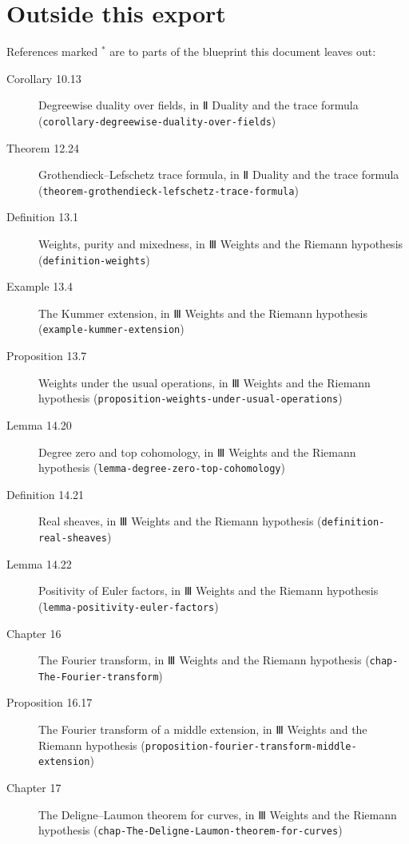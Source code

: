\documentclass[11pt]{article}
\newcommand{\bpslug}[1]{\texttt{#1}}
\begin{document}
\section*{Outside this export}
References marked \ensuremath{{}^\ast} are to parts of the blueprint this document leaves out:
\begin{description}
\item[Corollary 10.13] Degreewise duality over fields, in Ⅱ Duality and the trace formula (\bpslug{corollary-{}\allowbreak{}degreewise-{}\allowbreak{}duality-{}\allowbreak{}over-{}\allowbreak{}fields})
\item[Theorem 12.24] Grothendieck–Lefschetz trace formula, in Ⅱ Duality and the trace formula (\bpslug{theorem-{}\allowbreak{}grothendieck-{}\allowbreak{}lefschetz-{}\allowbreak{}trace-{}\allowbreak{}formula})
\item[Definition 13.1] Weights, purity and mixedness, in Ⅲ Weights and the Riemann hypothesis (\bpslug{definition-{}\allowbreak{}weights})
\item[Example 13.4] The Kummer extension, in Ⅲ Weights and the Riemann hypothesis (\bpslug{example-{}\allowbreak{}kummer-{}\allowbreak{}extension})
\item[Proposition 13.7] Weights under the usual operations, in Ⅲ Weights and the Riemann hypothesis (\bpslug{proposition-{}\allowbreak{}weights-{}\allowbreak{}under-{}\allowbreak{}usual-{}\allowbreak{}operations})
\item[Lemma 14.20] Degree zero and top cohomology, in Ⅲ Weights and the Riemann hypothesis (\bpslug{lemma-{}\allowbreak{}degree-{}\allowbreak{}zero-{}\allowbreak{}top-{}\allowbreak{}cohomology})
\item[Definition 14.21] Real sheaves, in Ⅲ Weights and the Riemann hypothesis (\bpslug{definition-{}\allowbreak{}real-{}\allowbreak{}sheaves})
\item[Lemma 14.22] Positivity of Euler factors, in Ⅲ Weights and the Riemann hypothesis (\bpslug{lemma-{}\allowbreak{}positivity-{}\allowbreak{}euler-{}\allowbreak{}factors})
\item[Chapter 16] The Fourier transform, in Ⅲ Weights and the Riemann hypothesis (\bpslug{chap-{}\allowbreak{}The-{}\allowbreak{}Fourier-{}\allowbreak{}transform})
\item[Proposition 16.17] The Fourier transform of a middle extension, in Ⅲ Weights and the Riemann hypothesis (\bpslug{proposition-{}\allowbreak{}fourier-{}\allowbreak{}transform-{}\allowbreak{}middle-{}\allowbreak{}extension})
\item[Chapter 17] The Deligne–Laumon theorem for curves, in Ⅲ Weights and the Riemann hypothesis (\bpslug{chap-{}\allowbreak{}The-{}\allowbreak{}Deligne-{}\allowbreak{}Laumon-{}\allowbreak{}theorem-{}\allowbreak{}for-{}\allowbreak{}curves})
\end{description}
\clearpage{}%
\end{document}
